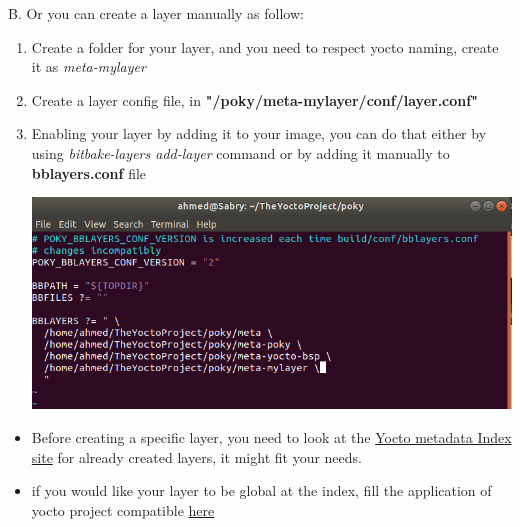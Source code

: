 \documentclass{article}
\begin{document}
B. Or you can create a layer manually as follow:
\begin{enumerate}
    \item Create a folder for your layer, and you need to respect yocto naming, create it as \textit{meta-mylayer}
    
    
    \item Create a layer config file, in \textbf{"/poky/meta-mylayer/conf/layer.conf"}
    
    
    \item Enabling your layer by adding it to your image, you can do that either by using \textit{bitbake-layers add-layer} command or by adding it manually to \textbf{bblayers.conf} file 
    
    
    
    \begin{center}
  \includegraphics[scale=0.60]{./resources/img/append-to-bblayer.confFile.png}
\end{center}
\end{enumerate}

\begin{mybox}[title={Note: Yocto meta-layer index site ?}]
\begin{itemize}
    \item Before creating a specific layer, you need to look at the \href{https://layers.openembedded.org/layerindex/branch/master/layers/}{Yocto metadata Index site} for already created layers, it might fit your needs.
    \item if you would like your layer to be global at the index, fill the application of yocto project compatible \href{https://www.yoctoproject.org/ecosystem/branding/compatible-registration/}{here}
\end{itemize}  
\end{mybox}
\end{document}
